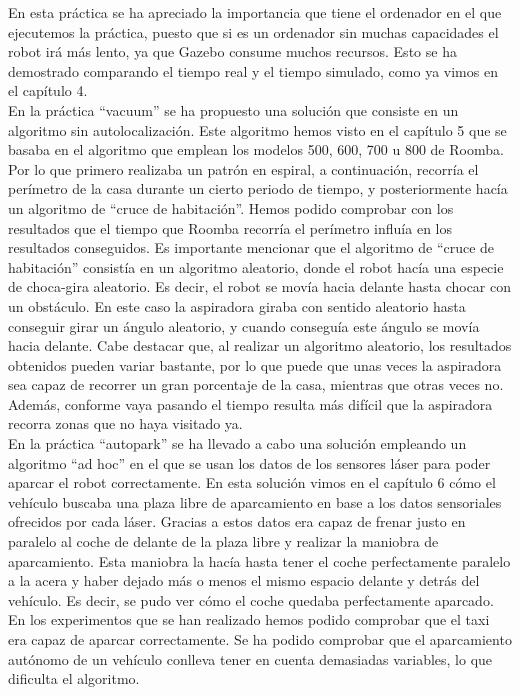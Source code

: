 En esta práctica se ha apreciado la importancia que tiene el ordenador en el que ejecutemos la práctica, puesto que si es un ordenador sin muchas capacidades el robot irá más lento, ya que Gazebo consume muchos recursos. Esto se ha demostrado comparando el tiempo real y el tiempo simulado, como ya vimos en el capítulo 4.\\

En la práctica ``vacuum'' se ha propuesto una solución que consiste en un algoritmo sin autolocalización. Este algoritmo hemos visto en el capítulo 5 que se basaba en el algoritmo que emplean los modelos 500, 600, 700 u 800 de Roomba. Por lo que primero realizaba un patrón en espiral, a continuación, recorría el perímetro de la casa durante un cierto periodo de tiempo, y posteriormente hacía un algoritmo de ``cruce de habitación''. Hemos podido comprobar con los resultados que el tiempo que Roomba recorría el perímetro influía en los resultados conseguidos. Es importante mencionar que el algoritmo de ``cruce de habitación'' consistía en un algoritmo aleatorio, donde el robot hacía una especie de choca-gira aleatorio. Es decir, el robot se movía hacia delante hasta chocar con un obstáculo. En este caso la aspiradora giraba con sentido aleatorio hasta conseguir girar un ángulo aleatorio, y cuando conseguía este ángulo se movía hacia delante. Cabe destacar que, al realizar un algoritmo aleatorio, los resultados obtenidos pueden variar bastante, por lo que puede que unas veces la aspiradora sea capaz de recorrer un gran porcentaje de la casa, mientras que otras veces no. Además, conforme vaya pasando el tiempo resulta más difícil que la aspiradora recorra zonas que no haya visitado ya.\\

En la práctica ``autopark'' se ha llevado a cabo una solución empleando un algoritmo ``ad hoc'' en el que se usan los datos de los sensores láser para poder aparcar el robot correctamente. En esta solución vimos en el capítulo 6 cómo el vehículo buscaba una plaza libre de aparcamiento en base a los datos sensoriales ofrecidos por cada láser. Gracias a estos datos era capaz de frenar justo en paralelo al coche de delante de la plaza libre y realizar la maniobra de aparcamiento. Esta maniobra la hacía hasta tener el coche perfectamente paralelo a la acera y haber dejado más o menos el mismo espacio delante y detrás del vehículo. Es decir, se pudo ver cómo el coche quedaba perfectamente aparcado. En los experimentos que se han realizado hemos podido comprobar que el taxi era capaz de aparcar correctamente. Se ha podido comprobar que el aparcamiento autónomo de un vehículo conlleva tener en cuenta demasiadas variables, lo que dificulta el algoritmo.\\

